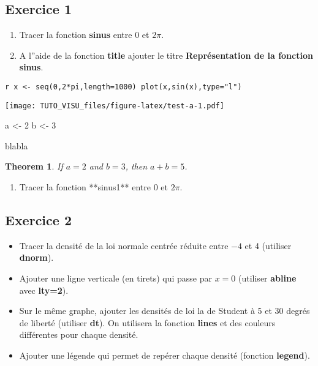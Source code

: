 \documentclass[]{book}
\newenvironment{Shaded}{\begin{snugshade}}{\end{snugshade}}
\newcommand{\DecValTok}[1]{\textcolor[rgb]{0.00,0.00,0.81}{#1}}
\newcommand{\NormalTok}[1]{#1}
\newcommand{\StringTok}[1]{\textcolor[rgb]{0.31,0.60,0.02}{#1}}
\providecommand{\tightlist}{%
  \setlength{\itemsep}{0pt}\setlength{\parskip}{0pt}}
\newtheorem{theorem}{Theorem}[chapter]
\theoremstyle{definition}
\theoremstyle{definition}
\theoremstyle{definition}
\theoremstyle{remark}
\let\BeginKnitrBlock\begin \let\EndKnitrBlock\end
\begin{document}
\hypertarget{exercice-1}{%
\subsection{Exercice 1}\label{exercice-1}}

\BeginKnitrBlock{exercise}[Pythagorean theorem]
\protect\hypertarget{exr:unnamed-chunk-11}{}{\label{exr:unnamed-chunk-11} \iffalse (Pythagorean theorem) \fi{} }

\begin{enumerate}
\def\labelenumi{\arabic{enumi}.}
\tightlist
\item
  Tracer la fonction \textbf{sinus} entre \(0\) et \(2\pi\).
\item
  A l''aide de la fonction \textbf{title} ajouter le titre \textbf{Représentation de la fonction sinus}.
\end{enumerate}

\texttt{r\ x\ \textless{}-\ seq(0,2*pi,length=1000)\ plot(x,sin(x),type="l")}
\EndKnitrBlock{exercise}

\texttt{[image: TUTO\_VISU\_files/figure-latex/test-a-1.pdf]}

\begin{Shaded}
\begin{Highlighting}[]
\NormalTok{a <-}\StringTok{ }\DecValTok{2}
\NormalTok{b <-}\StringTok{ }\DecValTok{3}
\end{Highlighting}
\end{Shaded}

blabla

\begin{theorem}

If $a = 2$ and $b = 3$, then $a + b = 5$.

\end{theorem}

\begin{enumerate}
\item Tracer la fonction **sinus1** entre $0$ et $2\pi$.
\end{enumerate}

\hypertarget{exercice-2}{%
\subsection{Exercice 2}\label{exercice-2}}

\begin{itemize}
\tightlist
\item
  Tracer la densité de la loi normale centrée réduite entre \(-4\) et 4 (utiliser \textbf{dnorm}).
\item
  Ajouter une ligne verticale (en tirets) qui passe par \(x=0\) (utiliser \textbf{abline} avec \textbf{lty=2}).
\item
  Sur le même graphe, ajouter les densités de loi la de Student à 5 et 30 degrés de liberté (utiliser \textbf{dt}). On utilisera la fonction \textbf{lines} et des couleurs différentes pour chaque densité.
\item
  Ajouter une légende qui permet de repérer chaque densité (fonction \textbf{legend}).
\end{itemize}
\end{document}
